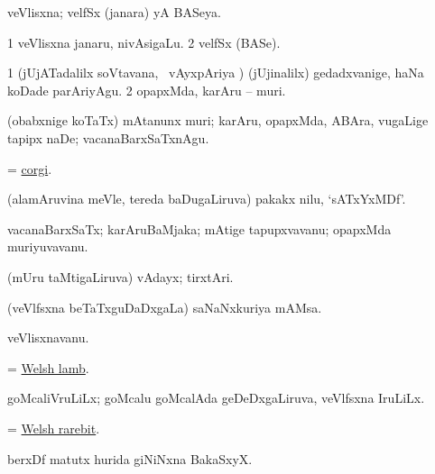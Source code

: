 \bentry
{} 
\gl{\gu}
\expl{}
\bmng
veVlisxna; velfSx (janara) yA BASeya. 
\emng
\eentry

\bentry
{} 
\gl{\nA}
\expl{}
\bmng
\bnum
\num{1} veVlisxna janaru, nivAsigaLu. 
\num{2} velfSx (BASe). 
\enum
\emng
\eentry

\bentry
{} 
\gl{\akirx}
\expl{}
\bmng
\bnum
\num{1} (jUjATadalilx soVtavana, \kanmu\ vAyxpAriya \vi) (jUjinalilx) gedadxvanige, haNa koDade parAriyAgu. 
\num{2} opapxMda, karAru -- muri. 
\enum
\emng

\noindent 
\gl{\pagu}
\expl{}
\bmng
{} (obabxnige koTaTx) mAtanunx muri; karAru, opapxMda, ABAra, \mo vugaLige tapipx naDe; vacanaBarxSaTxnAgu. 
\emng
\eentry

\bentry
{} 
\gl{\nA}
\expl{}
\bmng
= \hyperref{kandict_c.pdf}{C}{corgi}{corgi}. 
\emng
\eentry

\bentry
{} 
\gl{\nA}
\expl{}
\bmng
(alamAruvina meVle, tereda baDugaLiruva) pakakx nilu, `sATxYxMDf'. 
\emng
\eentry

\bentry
{} 
\gl{\nA}
\expl{}
\bmng
vacanaBarxSaTx; karAruBaMjaka; mAtige tapupxvavanu; opapxMda muriyuvavanu. 
\emng
\eentry

\bentry
{} 
\gl{\nA}
\expl{}
\bmng
(mUru taMtigaLiruva) vAdayx; tirxtAri. 
\emng
\eentry

\bentry
{} 
\gl{\nA}
\expl{}
\bmng
(veVlfsxna beTaTxguDaDxgaLa) saNaNxkuriya mAMsa. 
\emng
\eentry

\bentry
{} 
\gl{\nA}
\bmng
veVlisxnavanu. 
\emng
\eentry

\bentry
{} 
\gl{\nA}
\expl{}
\bmng
= \hyperlink{Welsh lamb}{Welsh lamb}. 
\emng
\eentry

\bentry
{} 
\gl{\nA}
\expl{}
\bmng
goMcaliVruLiLx; goMcalu goMcalAda geDeDxgaLiruva, veVlfsxna IruLiLx. 
\emng
\eentry

\bentry
{} 
\gl{\nA}
\expl{}
\bmng
= \hyperlink{Welsh rarebit}{Welsh rarebit}. 
\emng
\eentry

\bentry
{} 
\gl{\nA}
\expl{}
\bmng
berxDf matutx hurida giNiNxna BakaSxyX. 
\emng
\eentry

